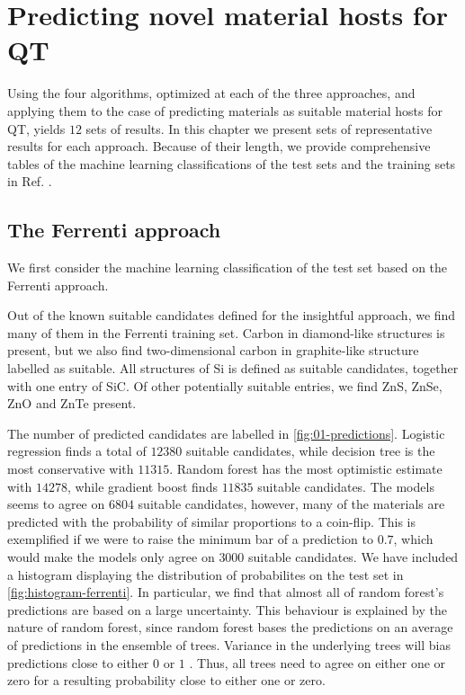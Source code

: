 \chapter{Predicting novel material hosts for QT}

Using the four algorithms, optimized at each of the three approaches, and applying them to the case of predicting materials as suitable material hosts for QT, yields $12$ sets of results. In this chapter we present sets of representative results for each approach. Because of their length, we provide comprehensive tables of the machine learning classifications of the test sets and the training sets in Ref. \cite{Ohebbi2021}.

\section{The Ferrenti approach}

We first consider the machine learning classification of the test set based on the Ferrenti approach.

Out of the known suitable candidates defined for the insightful approach, we find many of them in the Ferrenti training set. Carbon in diamond-like structures is present, but we also find two-dimensional carbon in graphite-like structure labelled as suitable. All structures of Si is defined as suitable candidates, together with one entry of SiC. Of other potentially suitable entries, we find ZnS, ZnSe, ZnO and ZnTe present.



The number of predicted candidates are labelled in \autoref{fig:01-predictions}. Logistic regression finds a total of $12380$ suitable candidates, while decision tree is the most conservative with $11315$. Random forest has the most optimistic estimate with $14278$, while gradient boost finds $11835$ suitable candidates. The models seems to agree on $6804$ suitable candidates, however, many of the materials are predicted with the probability of similar proportions to a coin-flip. This is exemplified if we were to raise the minimum bar of a prediction to $0.7$, which would make the models only agree on $3000$ suitable candidates. We have included a histogram displaying the distribution of probabilites on the test set in \autoref{fig:histogram-ferrenti}.
In particular, we find that almost all of random forest's predictions are based on a large uncertainty. This behaviour is explained by the nature of random forest, since random forest bases the predictions on an average of predictions in the ensemble of trees. Variance in the underlying trees will bias predictions close to either $0$ or $1$ \cite{NiculescuMizil2005}. Thus, all trees need to agree on either one or zero for a resulting probability close to either one or zero.


